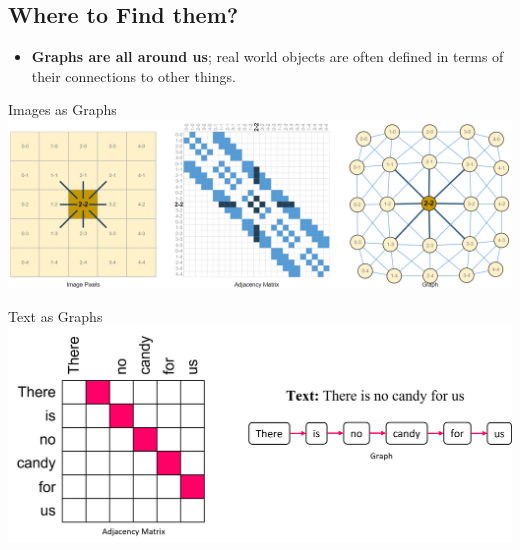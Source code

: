 \documentclass[
    11pt, %
    aspectratio=169, %
]{beamer}
\begin{document}
\subsection{Where to Find them?}
\begin{frame}{}
    \begin{itemize}
        \item[] \Large \textbf{Graphs are all around us}; \large real world objects are often defined in terms of their connections to other things.
    \end{itemize}
\end{frame}

\begin{frame}{Images as Graphs}
    \centering
    \includegraphics[width=\textwidth]{Images/img2graph.png}
\end{frame}

\begin{frame}{Text as Graphs}
    \centering
    \includegraphics[width=.9\textwidth]{Images/text2graph.png}
\end{frame}
\end{document}
